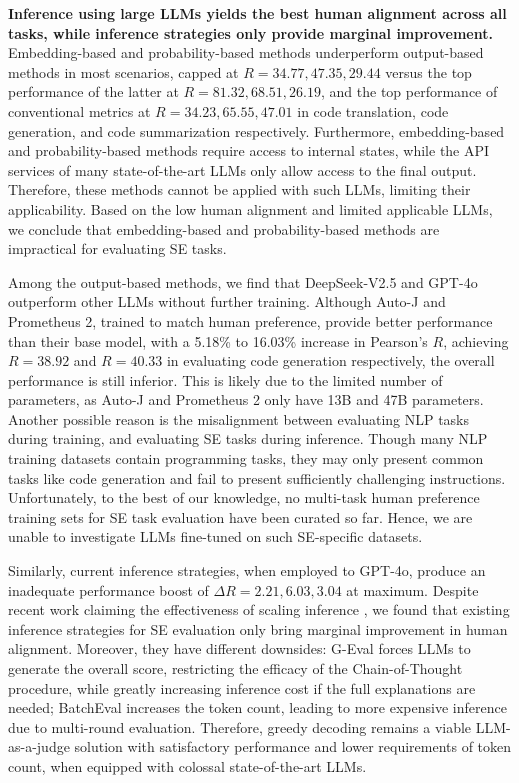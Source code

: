 \textbf{Inference using large LLMs yields the best human alignment across all tasks, while inference strategies only provide marginal improvement.} Embedding-based and probability-based methods underperform output-based methods in most scenarios, capped at \(R=34.77,47.35,29.44\) versus the top performance of the latter at \(R=81.32,68.51,26.19\), and the top performance of conventional metrics at \(R=34.23,65.55,47.01\) in code translation, code generation, and code summarization respectively. Furthermore, embedding-based and probability-based methods require access to internal states, while the API services of many state-of-the-art LLMs only allow access to the final output. Therefore, these methods cannot be applied with such LLMs, limiting their applicability. Based on the low human alignment and limited applicable LLMs, we conclude that embedding-based and probability-based methods are impractical for evaluating SE tasks.

Among the output-based methods, we find that DeepSeek-V2.5 and GPT-4o outperform other LLMs without further training. Although Auto-J and Prometheus 2, trained to match human preference, provide better performance than their base model, with a 5.18\% to 16.03\% increase in Pearson's \(R\), achieving \(R=38.92\) and \(R=40.33\) in evaluating code generation respectively, the overall performance is still inferior. This is likely due to the limited number of parameters, as Auto-J and Prometheus 2 only have 13B and 47B parameters. Another possible reason is the misalignment between evaluating NLP tasks during training, and evaluating SE tasks during inference. Though many NLP training datasets contain programming tasks, they may only present common tasks like code generation and fail to present sufficiently challenging instructions. Unfortunately, to the best of our knowledge, no multi-task human preference training sets for SE task evaluation have been curated so far. Hence, we are unable to investigate LLMs fine-tuned on such SE-specific datasets.

Similarly, current inference strategies, when employed to GPT-4o, produce an inadequate performance boost of \(\Delta R=2.21,6.03,3.04\) at maximum. Despite recent work claiming the effectiveness of scaling inference \cite{DBLP:journals/corr/abs-2408-03314}, we found that existing inference strategies for SE evaluation only bring marginal improvement in human alignment. Moreover, they have different downsides: G-Eval forces LLMs to generate the overall score, restricting the efficacy of the Chain-of-Thought procedure, while greatly increasing inference cost if the full explanations are needed; BatchEval increases the token count, leading to more expensive inference due to multi-round evaluation. Therefore, greedy decoding remains a viable LLM-as-a-judge solution with satisfactory performance and lower requirements of token count, when equipped with colossal state-of-the-art LLMs.

